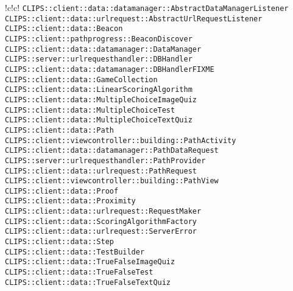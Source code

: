 \begin{tabella}{!{\VRule}c!{\VRule}c!{\VRule}}
{\texttt{CLIPS::client::data::datamanager::AbstractDataManagerListener} \\ 
\texttt{CLIPS::client::data::urlrequest::AbstractUrlRequestListener} \\ 
\texttt{CLIPS::client::data::Beacon} \\ 
\texttt{CLIPS::client::pathprogress::BeaconDiscover} \\ 
\texttt{CLIPS::client::data::datamanager::DataManager} \\ 
\texttt{CLIPS::server::urlrequesthandler::DBHandler} \\ 
\texttt{CLIPS::client::data::datamanager::DBHandlerFIXME} \\ 
\texttt{CLIPS::client::data::GameCollection} \\ 
\texttt{CLIPS::client::data::LinearScoringAlgorithm} \\ 
\texttt{CLIPS::client::data::MultipleChoiceImageQuiz} \\ 
\texttt{CLIPS::client::data::MultipleChoiceTest} \\ 
\texttt{CLIPS::client::data::MultipleChoiceTextQuiz} \\ 
\texttt{CLIPS::client::data::Path} \\ 
\texttt{CLIPS::client::viewcontroller::building::PathActivity} \\ 
\texttt{CLIPS::client::data::datamanager::PathDataRequest} \\ 
\texttt{CLIPS::server::urlrequesthandler::PathProvider} \\ 
\texttt{CLIPS::client::data::urlrequest::PathRequest} \\ 
\texttt{CLIPS::client::viewcontroller::building::PathView} \\ 
\texttt{CLIPS::client::data::Proof} \\ 
\texttt{CLIPS::client::data::Proximity} \\ 
\texttt{CLIPS::client::data::urlrequest::RequestMaker} \\ 
\texttt{CLIPS::client::data::ScoringAlgorithmFactory} \\ 
\texttt{CLIPS::client::data::urlrequest::ServerError} \\ 
\texttt{CLIPS::client::data::Step} \\ 
\texttt{CLIPS::client::data::TestBuilder} \\ 
\texttt{CLIPS::client::data::TrueFalseImageQuiz} \\ 
\texttt{CLIPS::client::data::TrueFalseTest} \\ 
\texttt{CLIPS::client::data::TrueFalseTextQuiz} \\ 
}
\end{tabella}
